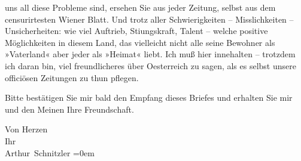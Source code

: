                uns all diese Probleme sind, ersehen Sie aus jeder Zeitung, selbst aus dem
               censurirtesten Wiener Blatt. Und trotz aller
               Schwierigkeiten – Misslichkeiten – Unsicherheiten: wie viel Auftrieb, Sti{\geminationm}ungskraft, Talent – welche positive Möglichkeiten in
               diesem Land, das vielleicht
               nicht {\pb}alle seine Bewohner als »Vaterland« aber
               jeder als »Heimat« liebt. Ich muß hier innehalten – trotzdem ich daran bin, viel
               freundlicheres über Oesterreich zu sagen, als
               es \introOben{}selbst\introOben{} unsere officiösen Zeitungen zu thun pflegen.\pend
           
\pstart
           Bitte bestätigen Sie mir bald den Empfang dieses Briefes und erhalten Sie mir und den
               Meinen Ihre Freundschaft.\pend
           
\pstart
           Von Herzen{\\[\baselineskip]}Ihr{\\[\baselineskip]}\spacefill\mbox{Arthur Schnitzler}\pend
           \leftskip=0em{}\endnumbering{}  
      